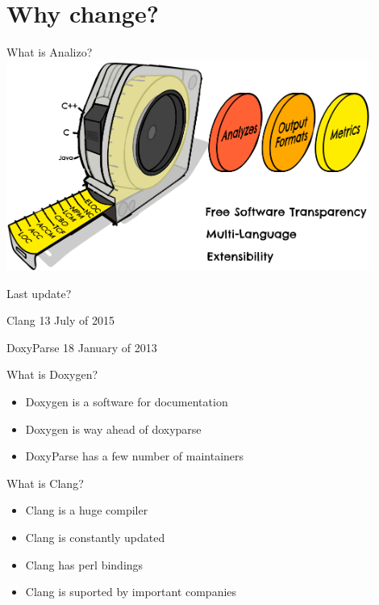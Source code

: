 \section{Why change?} %
\label{sec:why_change_}

\begin{frame}{What is Analizo?}
    \centering
        \includegraphics[width=0.9\textwidth]{conteudo/prod_box.png}
\end{frame}

\begin{frame}{Last update?}
\begin{Parallel}[v]{5cm}{5cm}
    \ParallelLText%
    {

        {\ttfamily Clang}  13 July of 2015
    }
    \ParallelRText%
    {
        {\ttfamily DoxyParse} 18 January of 2013
	}
\end{Parallel}
\end{frame}

\begin{frame}{What is Doxygen?}
   \begin{itemize} 
        \item Doxygen is a software for documentation
        \item Doxygen is way ahead of doxyparse
        \item DoxyParse has a few number of maintainers
    \end{itemize} 
\end{frame}

\begin{frame}{What is Clang?}
   \begin{itemize} 
        \item Clang is a huge compiler  
        \item Clang is constantly updated
        \item Clang has perl bindings
        \item Clang is suported by important companies
    \end{itemize}
\end{frame}

